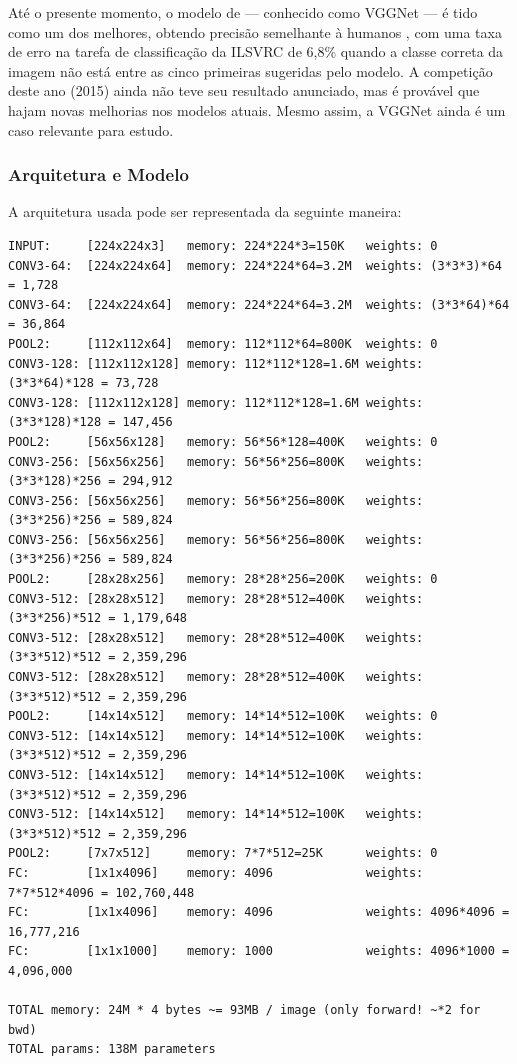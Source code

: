 Até o presente momento, o modelo de \citep{zeiler2014visualizing} --- conhecido
como VGGNet --- é tido como um dos melhores, obtendo precisão semelhante à
humanos \citep{human}, com uma taxa de erro na tarefa de classificação da ILSVRC
de 6,8\% quando a classe correta da imagem não está entre as cinco primeiras
sugeridas pelo modelo. A competição deste ano (2015) ainda não teve seu
resultado anunciado, mas é provável que hajam novas melhorias nos modelos
atuais. Mesmo assim, a VGGNet ainda é um caso relevante para estudo.

\subsubsection{Arquitetura e Modelo}

A arquitetura usada pode ser representada da seguinte maneira:~\cite{cs231n}

\begin{footnotesize}
\begin{verbatim}
INPUT:     [224x224x3]   memory: 224*224*3=150K   weights: 0
CONV3-64:  [224x224x64]  memory: 224*224*64=3.2M  weights: (3*3*3)*64 = 1,728
CONV3-64:  [224x224x64]  memory: 224*224*64=3.2M  weights: (3*3*64)*64 = 36,864
POOL2:     [112x112x64]  memory: 112*112*64=800K  weights: 0
CONV3-128: [112x112x128] memory: 112*112*128=1.6M weights: (3*3*64)*128 = 73,728
CONV3-128: [112x112x128] memory: 112*112*128=1.6M weights: (3*3*128)*128 = 147,456
POOL2:     [56x56x128]   memory: 56*56*128=400K   weights: 0
CONV3-256: [56x56x256]   memory: 56*56*256=800K   weights: (3*3*128)*256 = 294,912
CONV3-256: [56x56x256]   memory: 56*56*256=800K   weights: (3*3*256)*256 = 589,824
CONV3-256: [56x56x256]   memory: 56*56*256=800K   weights: (3*3*256)*256 = 589,824
POOL2:     [28x28x256]   memory: 28*28*256=200K   weights: 0
CONV3-512: [28x28x512]   memory: 28*28*512=400K   weights: (3*3*256)*512 = 1,179,648
CONV3-512: [28x28x512]   memory: 28*28*512=400K   weights: (3*3*512)*512 = 2,359,296
CONV3-512: [28x28x512]   memory: 28*28*512=400K   weights: (3*3*512)*512 = 2,359,296
POOL2:     [14x14x512]   memory: 14*14*512=100K   weights: 0
CONV3-512: [14x14x512]   memory: 14*14*512=100K   weights: (3*3*512)*512 = 2,359,296
CONV3-512: [14x14x512]   memory: 14*14*512=100K   weights: (3*3*512)*512 = 2,359,296
CONV3-512: [14x14x512]   memory: 14*14*512=100K   weights: (3*3*512)*512 = 2,359,296
POOL2:     [7x7x512]     memory: 7*7*512=25K      weights: 0
FC:        [1x1x4096]    memory: 4096             weights: 7*7*512*4096 = 102,760,448
FC:        [1x1x4096]    memory: 4096             weights: 4096*4096 = 16,777,216
FC:        [1x1x1000]    memory: 1000             weights: 4096*1000 = 4,096,000

TOTAL memory: 24M * 4 bytes ~= 93MB / image (only forward! ~*2 for bwd)
TOTAL params: 138M parameters

\end{verbatim}
\end{footnotesize}

